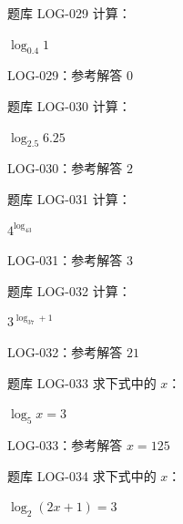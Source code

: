 \documentclass[aspectratio=169,10pt]{beamer}
\begin{document}
\begin{campuspractice}{题库 LOG-029}
计算：\par
$\log_{0.4}1$
\end{campuspractice}

\ifdefined\TeacherEdition
\begin{frame}[t]{LOG-029：参考解答}
$0$
\end{frame}
\fi

\begin{campuspractice}{题库 LOG-030}
计算：\par
$\log_{2.5}6.25$
\end{campuspractice}

\ifdefined\TeacherEdition
\begin{frame}[t]{LOG-030：参考解答}
$2$
\end{frame}
\fi

\begin{campuspractice}{题库 LOG-031}
计算：\par
$4^{\log_43}$
\end{campuspractice}

\ifdefined\TeacherEdition
\begin{frame}[t]{LOG-031：参考解答}
$3$
\end{frame}
\fi

\begin{campuspractice}{题库 LOG-032}
计算：\par
$3^{\log_37+1}$
\end{campuspractice}

\ifdefined\TeacherEdition
\begin{frame}[t]{LOG-032：参考解答}
$21$
\end{frame}
\fi

\begin{campuspractice}{题库 LOG-033}
求下式中的 $x$：\par
$\log_5x=3$
\end{campuspractice}

\ifdefined\TeacherEdition
\begin{frame}[t]{LOG-033：参考解答}
$x=125$
\end{frame}
\fi

\begin{campuspractice}{题库 LOG-034}
求下式中的 $x$：\par
$\log_2(2x+1)=3$
\end{campuspractice}
\end{document}
